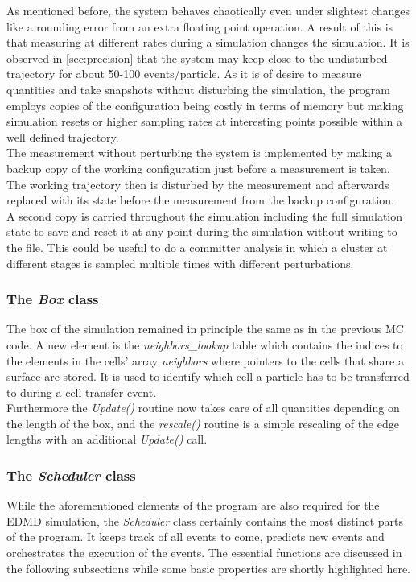 As mentioned before, the system behaves chaotically even under slightest changes like a rounding error from an extra floating point operation. A result of this is that measuring at different rates during a simulation changes the simulation. It is observed in \autoref{sec:precision} that the system may keep close to the undisturbed trajectory for about 50-100 events/particle. As it is of desire to measure quantities and take snapshots without disturbing the simulation, the program employs copies of the configuration being costly in terms of memory but making simulation resets or higher sampling rates at interesting points possible within a well defined trajectory.\\ 

The measurement without perturbing the system is implemented by making a backup copy of the working configuration just before a measurement is taken. The working trajectory then is disturbed by the measurement and afterwards replaced with its state before the measurement from the backup configuration.\\
A second copy is carried throughout the simulation including the full simulation state to save and reset it at any point during the simulation without writing to the file. This could be useful to do a committer analysis in which a cluster at different stages is sampled multiple times with different perturbations.

\subsubsection{The \textit{Box} class}
\label{sec:box_class}
The box of the simulation remained in principle the same as in the previous MC code. A new element is the \textit{neighbors\_lookup} table which contains the indices to the elements in the cells' array \textit{neighbors} where pointers to the cells that share a surface are stored. It is used to identify which cell a particle has to be transferred to during a cell transfer event.\\

Furthermore the \textit{Update()} routine now takes care of all quantities depending on the length of the box, and the \textit{rescale()} routine is a simple rescaling of the edge lengths with an additional \textit{Update()} call.

\subsubsection{The \textit{Scheduler} class}
\label{sec:scheduler_class}
While the aforementioned elements of the program are also required for the EDMD simulation, the \textit{Scheduler} class certainly contains the most distinct parts of the program. It keeps track of all events to come, predicts new events and orchestrates the execution of the events. The essential functions are discussed in the following subsections while some basic properties are shortly highlighted here.\\

